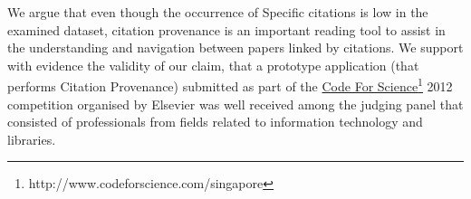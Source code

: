 We argue that even though the occurrence of Specific citations is low in the examined dataset, citation provenance is an important reading tool to assist in the understanding and navigation between papers linked by citations. 
We support with evidence the validity of our claim, that a prototype application (that performs Citation Provenance) submitted as part of the \url{Code For Science}\footnote{http://www.codeforscience.com/singapore} 2012 competition organised by Elsevier was well received among the judging panel that consisted of professionals from fields related to information technology and libraries.

